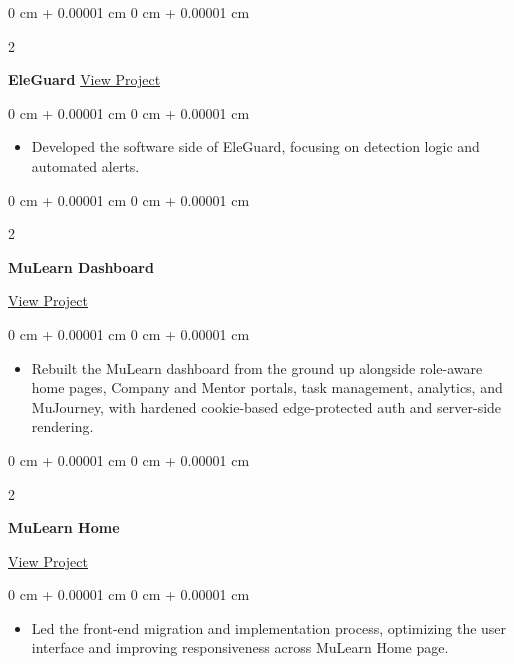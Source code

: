 \documentclass[10pt, letterpaper]{article}
\newenvironment{highlights}{
    \begin{itemize}[
        topsep=0.10 cm,
        parsep=0.10 cm,
        partopsep=0pt,
        itemsep=0pt,
        leftmargin=0 cm + 10pt
    ]
}{
    \end{itemize}
} %
\newenvironment{onecolentry}{
    \begin{adjustwidth}{
        0 cm + 0.00001 cm
    }{
        0 cm + 0.00001 cm
    }
}{
    \end{adjustwidth}
} %
\newenvironment{twocolentry}[2][]{
    \onecolentry
    \def\secondColumn{#2}
    \setcolumnwidth{\fill, 4.5 cm}
    \begin{paracol}{2}
}{
    \switchcolumn \raggedleft \secondColumn
    \end{paracol}
    \endonecolentry
} %
\begin{document}
        \begin{twocolentry}{
            \href{https://alvinn.me/projects/eleguard}{View Project}
        }
            \textbf{EleGuard}\end{twocolentry}

        \vspace{0.10 cm}
        \begin{onecolentry}
            \begin{highlights}
                \item Developed the software side of EleGuard, focusing on detection logic and automated alerts.
            \end{highlights}
        \end{onecolentry}

        \vspace{0.1 cm}

        \begin{twocolentry}{
    \href{https://alvinn.me/projects/mulearn-5-0}{View Project}
}
    \textbf{MuLearn Dashboard}
\end{twocolentry}

\vspace{0.1cm}

\begin{onecolentry}
    \begin{highlights}
        \item Rebuilt the MuLearn dashboard from the ground up alongside role-aware home pages, Company and Mentor portals, task management, analytics, and MuJourney, with hardened cookie-based edge-protected auth and server-side rendering.
    \end{highlights}
\end{onecolentry}

\vspace{0.2cm}

\begin{twocolentry}{
    \href{https://alvinn.me/projects/mulearn-home}{View Project}
}
    \textbf{MuLearn Home}
\end{twocolentry}

\vspace{0.1cm}

\begin{onecolentry}
    \begin{highlights}
        \item Led the front-end migration and implementation process, optimizing the user interface and improving responsiveness across MuLearn Home page.
    \end{highlights}
\end{onecolentry}
\end{document}
